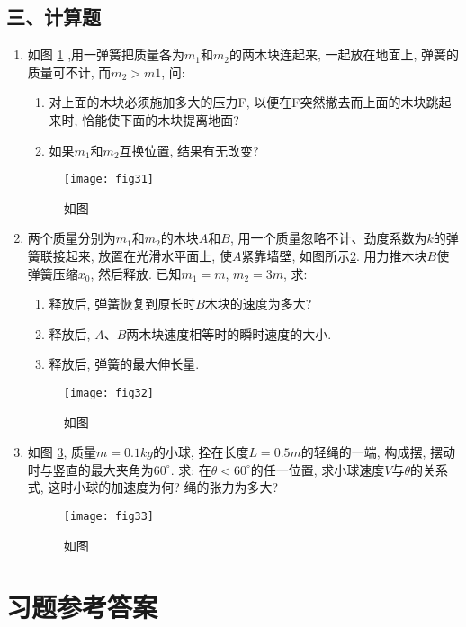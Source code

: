 \subsection*{三、计算题}
\begin{enumerate}
    \item 如图 \ref{fig:31} ,用一弹簧把质量各为$m_1$和$m_2$的两木块连起来, 一起放在地面上, 弹簧的质量可不计, 而$m_2>m1$, 问:
    \begin{enumerate}
        \item[(1)] 对上面的木块必须施加多大的压力F, 以便在F突然撤去而上面的木块跳起来时, 恰能使下面的木块提离地面?
        \item[(2)] 如果$m_1$和$m_2$互换位置, 结果有无改变?
    \end{enumerate}
    \begin{figure}[H]
        \centering
        \texttt{[image: fig31]}
            \caption{如图}\label{fig:31}
    \end{figure}
    \item 两个质量分别为$m_1$和$m_2$的木块$A$和$B$, 用一个质量忽略不计、劲度系数为$k$的弹簧联接起来, 放置在光滑水平面上, 使$A$紧靠墙壁, 如图所示\ref{fig:32}. 用力推木块$B$使弹簧压缩$x_0$,
    然后释放. 已知$m_1=m$, $m_2 = 3m$, 求:
    \begin{enumerate}
        \item[(1)] 释放后, 弹簧恢复到原长时$B$木块的速度为多大?
        \item[(2)] 释放后, $A$、$B$两木块速度相等时的瞬时速度的大小.
        \item[(3)] 释放后, 弹簧的最大伸长量.
    \end{enumerate}
    \begin{figure}[H]
        \centering
        \texttt{[image: fig32]}
            \caption{如图}\label{fig:32}
    \end{figure}
    \item 如图 \ref{fig:33}, 质量$m=0.1kg$的小球, 拴在长度$L=0.5m$的轻绳的一端, 构成摆, 摆动时与竖直的最大夹角为$60^\circ$. 求: 在$\theta<60^\circ$的任一位置, 求小球速度$V$与$\theta$的关系式, 
    这时小球的加速度为何? 绳的张力为多大?
    \begin{figure}[H]
        \centering
        \texttt{[image: fig33]}
            \caption{如图}\label{fig:33}
    \end{figure}
\end{enumerate}

\section{习题参考答案}
